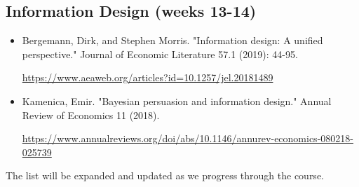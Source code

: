 \documentclass{article}
\begin{document}
\subsection{Information Design (weeks 13-14)}
\begin{itemize}
	\item Bergemann, Dirk, and Stephen Morris. "Information design: A unified perspective." Journal of Economic Literature 57.1 (2019): 44-95. 
	
	\url{https://www.aeaweb.org/articles?id=10.1257/jel.20181489}
	\item Kamenica, Emir. "Bayesian persuasion and information design." Annual Review of Economics 11 (2018).
	
	\url{https://www.annualreviews.org/doi/abs/10.1146/annurev-economics-080218-025739}
\end{itemize}

\bigskip
The list will be expanded and updated as we progress through the course.


\end{document}
